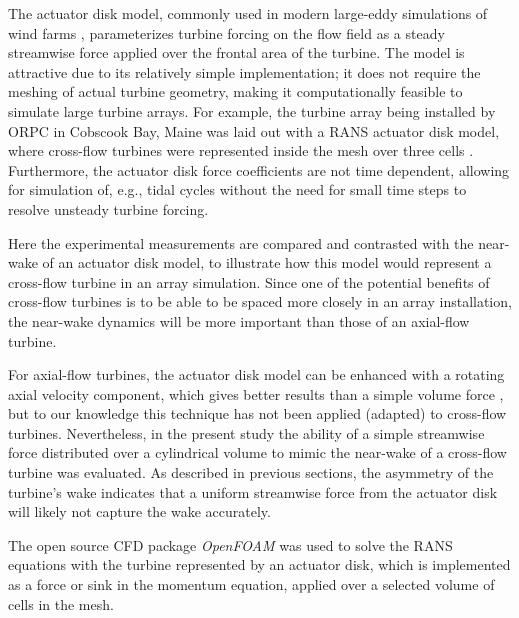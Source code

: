 The actuator disk model, commonly used in modern large-eddy simulations of wind
farms \cite{Stevens2014}, parameterizes turbine forcing on the flow field as a
steady streamwise force applied over the frontal area of the turbine. The model
is attractive due to its relatively simple implementation; it does not require
the meshing of actual turbine geometry, making it computationally feasible to
simulate large turbine arrays. For example, the turbine array being installed by
ORPC in Cobscook Bay, Maine was laid out with a RANS actuator disk model, where
cross-flow turbines were represented inside the mesh over three cells
\cite{Nelson2013}. Furthermore, the actuator disk force coefficients are not
time dependent, allowing for simulation of, e.g., tidal cycles without the need
for small time steps to resolve unsteady turbine forcing.

Here the experimental measurements are compared and contrasted with the
near-wake of an actuator disk model, to illustrate how this model would
represent a cross-flow turbine in an array simulation. Since one of the
potential benefits of cross-flow turbines is to be able to be spaced more
closely in an array installation, the near-wake dynamics will be more important
than those of an axial-flow turbine.

For axial-flow turbines, the actuator disk model can be enhanced with a rotating
axial velocity component, which gives better results than a simple volume force
\cite{Wu2011}, but to our knowledge this technique has not been applied
(adapted) to cross-flow turbines. Nevertheless, in the present study the
ability of a simple streamwise force distributed over a cylindrical volume to
mimic the near-wake of a cross-flow turbine was evaluated. As described in
previous sections, the asymmetry of the turbine's wake indicates that a uniform
streamwise force from the actuator disk will likely not capture the wake
accurately.

The open source CFD package \textit{OpenFOAM} was used to solve the  RANS
equations with the turbine represented by an actuator disk, which is
implemented as a force or sink in the momentum equation, applied over a selected
volume of cells in the mesh.

